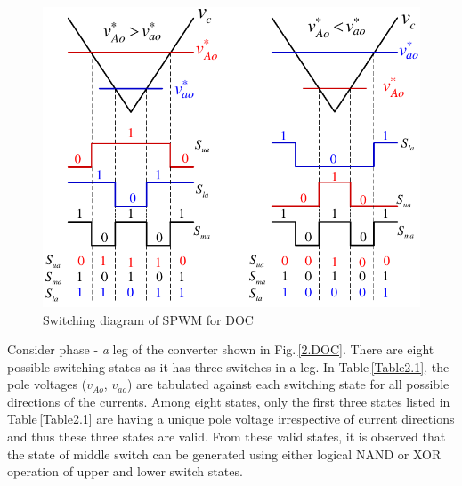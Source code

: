 \begin{figure}[h]
	\centering
	\includegraphics[scale=0.88]{figures/Chapter_1_2/Switching_Diagram_NSC}
	\caption{Switching diagram of SPWM for DOC}
	\label{2.switchingSPWM}
\end{figure}


Consider phase - \textit{a} leg of the converter shown in Fig.\,\ref{2.DOC}. There are eight possible switching states as it has three switches in a leg. In Table\,\ref{Table2.1}, the pole voltages ($v_{Ao}$, $v_{ao}$) are tabulated against each switching state for all possible directions of the currents. Among eight states, only the first three states listed in Table\,\ref{Table2.1} are having a unique pole voltage irrespective of current directions and thus these three states are valid. From these valid states, it is observed that the state of middle switch can be generated using either logical NAND or XOR operation of upper and lower switch states.

